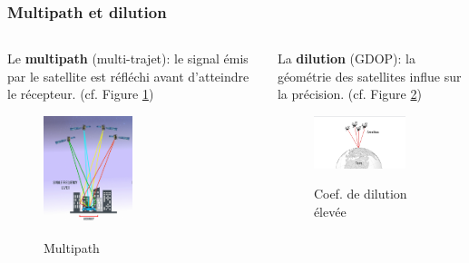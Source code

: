 \documentclass[xcolor=dvipsnames,envcountsect]{beamer}
\begin{document}
\begin{frame}
	\frametitle{Multipath et dilution}
	\justifying
	\begin{columns}
		\begin{column}{0.5\textwidth}
			Le \textbf{multipath} (multi-trajet): le signal émis par le satellite est réfléchi 
			avant d'atteindre le récepteur. (cf. Figure \ref{fig:multipath})
			\begin{figure}
				\centering
				\includegraphics[width=0.5\textwidth]{./Figures/multipath.png} \\
				\caption {Multipath \cite{esa}}
				\label{fig:multipath}
			\end{figure}
		\end{column}
		\begin{column}{0.5\textwidth}
			La \textbf{dilution} (GDOP): la géométrie des satellites influe sur la précision. (cf. Figure \ref{fig:dilution})
			\begin{figure}
				\centering
				\includegraphics[width=0.8\textwidth]{./Figures/dilution.png} \\
				\caption {Coef. de dilution élevée \cite{esa}}
				\label{fig:dilution}
			\end{figure}
			
		\end{column}
	\end{columns}
\end{frame}
\end{document}
